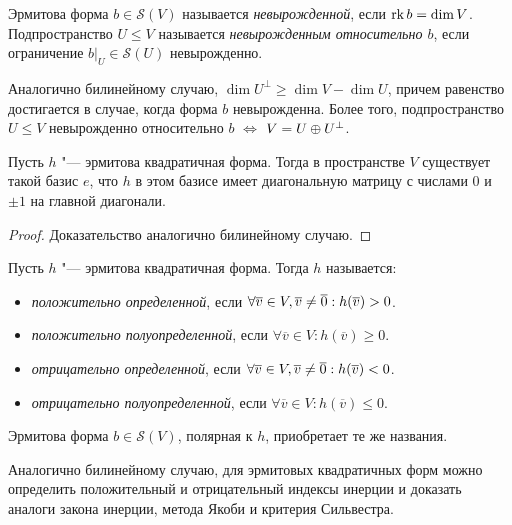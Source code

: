 \begin{definition}
	Эрмитова форма $b \in \mathcal{S}(V)$ называется \textit{невырожденной}, если $\rk{b} 
	\hm= \dim{V}$. Подпространство $U \le V$ называется \textit{невырожденным относительно $b$}, если ограничение $b|_U \in \mathcal{S}(U)$ невырожденно.
\end{definition}

\begin{note}
	Аналогично билинейному случаю, $\dim{U^\perp} \ge \dim{V} - \dim{U}$, причем равенство достигается в случае, когда форма $b$ невырожденна. Более того, подпространство $U \le V$ невырожденно относительно $b$ $\Leftrightarrow$ $V = U \hm{\oplus} U^{\perp}$.
\end{note}

\begin{proposition}
	Пусть $h$ "--- эрмитова квадратичная форма. Тогда в пространстве $V$ существует такой базис $e$, что $h$ в этом базисе имеет диагональную матрицу с числами $0$ и $\pm1$ на главной диагонали.
\end{proposition}

\begin{proof}
	Доказательство аналогично билинейному случаю.
\end{proof}

\begin{definition}
	Пусть $h$ "--- эрмитова квадратичная форма. Тогда $h$ называется:
	\begin{itemize}
		\item \textit{положительно определенной}, если $\forall \overline{v} \hm{\in} V, \overline{v} \ne \overline{0}: h(\overline{v}) \hm{>} 0$.
		\item \textit{положительно полуопределенной}, если $\forall \overline{v} \in V: h(\overline{v}) \ge 0$.
		\item \textit{отрицательно определенной}, если $\forall \overline{v} \in V, \overline{v} \ne \overline{0}: h(\overline{v}) \hm{<} 0$.
		\item \textit{отрицательно полуопределенной}, если $\forall \overline{v} \in V: h(\overline{v}) \le 0$.
	\end{itemize}
	
	Эрмитова форма $b \in \mathcal{S}(V)$, полярная к $h$, приобретает те же названия.
\end{definition}

\begin{note}
	Аналогично билинейному случаю, для эрмитовых квадратичных форм можно определить положительный и отрицательный индексы инерции и доказать аналоги закона инерции, метода Якоби и критерия Сильвестра.
\end{note}